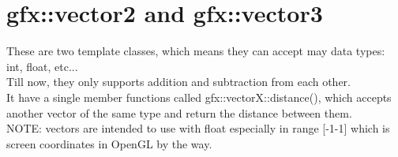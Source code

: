 \section{gfx::vector2 and gfx::vector3}
These are two template classes, which means they can accept may data types: int, float, etc...\\
Till now, they only supports addition and subtraction from each other. \\
It have a single member functions called gfx::vectorX::distance(), which accepts another vector 
of the same type and return the distance between them. \\
NOTE: vectors are intended to use with float especially in range [-1-1] which is screen coordinates in OpenGL by the way.
